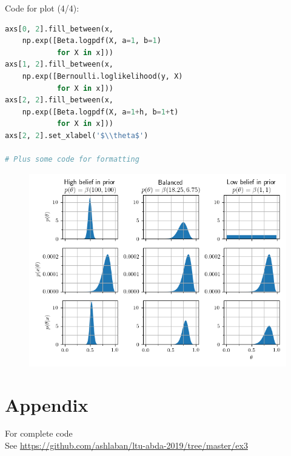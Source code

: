 \documentclass[usenames,dvipsnames,table]{beamer}
\begin{document}
\begin{frame}[fragile]
Code for plot (4/4):
\begin{lstlisting}[language=Python]
axs[0, 2].fill_between(x,
    np.exp([Beta.logpdf(X, a=1, b=1)
            for X in x]))
axs[1, 2].fill_between(x,
    np.exp([Bernoulli.loglikelihood(y, X)
            for X in x]))
axs[2, 2].fill_between(x,
    np.exp([Beta.logpdf(X, a=1+h, b=1+t)
            for X in x]))
axs[2, 2].set_xlabel('$\\theta$')

# Plus some code for formatting
\end{lstlisting}
\end{frame}

\begin{frame}
\begin{figure}
\centering
\includegraphics[height=0.8\textheight]{img/ex3B5aiii.png}
\end{figure}
\end{frame}


\section{Appendix}
\begin{frame}
\begin{center}
{\huge{For complete code}}
\\\vspace{2em}
See \url{https://github.com/ashlaban/ltu-abda-2019/tree/master/ex3}
\end{center}
\end{frame}
\end{document}
